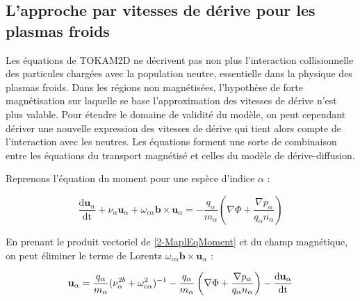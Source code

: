 \begin{refsection}
\section{L'approche par vitesses de dérive pour les plasmas
froids}
\label{vitessesDerivePlasmaFroid}
\parencite{Sudan}
Les équations de TOKAM2D ne décrivent
pas non plus l'interaction collisionnelle des particules chargées avec la
population neutre, essentielle dans la physique des plasmas froids. Dans les
régions non magnétisées, l'hypothèse de forte magnétisation sur laquelle se
base l'approximation des vitesses de dérive n'est plus valable. Pour étendre le
domaine de validité du modèle, on peut cependant dériver une nouvelle
expression des vitesses de dérive qui tient alors compte de l'interaction
avec les neutres. Les équations forment une sorte de combinaison entre les
équations du transport magnétisé et celles du modèle de dérive-diffusion.

Reprenons l'équation du moment pour une espèce d'indice $\alpha$ :

\begin{equation}
\label{2-MaplEqMoment}
\frac{\text{d}\mathbf{u}_\alpha}{\text{dt}}+
\nu_\alpha\mathbf{u}_\alpha+\omega_{c\alpha}\mathbf{b}\times\mathbf{u}_\alpha=
-\frac{q_\alpha}{m_\alpha}\left(\nabla \Phi +\frac{\nabla p_\alpha}{q_\alpha n_\alpha}\right)
\end{equation}

En prenant le produit vectoriel de \eqref{2-MaplEqMoment} et du champ
magnétique,  on peut éliminer le terme de
Lorentz $\omega_{c\alpha}\mathbf{b}\times\mathbf{u}_\alpha$ :

\begin{equation}
\label{2-MaplVitesse}
\mathbf{u}_\alpha=\frac{q_\alpha}{m_\alpha}(\nu_\alpha^{{2b}}+\omega_{c\alpha}^{{2}})^{{-1}}
-\frac{q_\alpha}{m_\alpha}\left(\nabla \Phi +\frac{\nabla p_\alpha}{q_\alpha
n_\alpha}\right)-\frac{\text{d}\mathbf{u}_\alpha}{\text{dt}}
\end{equation}


\end{refsection}
